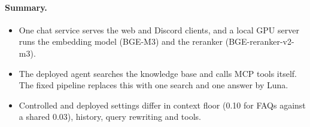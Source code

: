 \paragraph{Summary.}
\begin{itemize}
  \item One chat service serves the web and Discord clients, and a local GPU server runs the embedding model (BGE-M3) and the reranker (BGE-reranker-v2-m3).
  \item The deployed agent searches the knowledge base and calls MCP tools itself. The fixed pipeline replaces this with one search and one answer by Luna.
  \item Controlled and deployed settings differ in context floor (0.10 for FAQs against a shared 0.03), history, query rewriting and tools.
\end{itemize}
